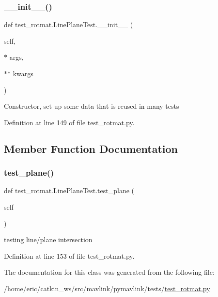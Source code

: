 \subsubsection{\texorpdfstring{\_\_init\_\_()}{\_\_init\_\_()}}
{\footnotesize\ttfamily def test\+\_\+rotmat.\+Line\+Plane\+Test.\+\_\+\+\_\+init\+\_\+\+\_\+ (\begin{DoxyParamCaption}\item[{}]{self,  }\item[{$\ast$}]{args,  }\item[{$\ast$$\ast$}]{kwargs }\end{DoxyParamCaption})}

\begin{DoxyVerb}Constructor, set up some data that is reused in many tests\end{DoxyVerb}
 

Definition at line 149 of file test\+\_\+rotmat.\+py.



\subsection{Member Function Documentation}
\mbox{\label{classtest__rotmat_1_1LinePlaneTest_a0fe03ac8059efebb1df1b6c32e0d18ac}} 
\subsubsection{\texorpdfstring{test\_plane()}{test\_plane()}}
{\footnotesize\ttfamily def test\+\_\+rotmat.\+Line\+Plane\+Test.\+test\+\_\+plane (\begin{DoxyParamCaption}\item[{}]{self }\end{DoxyParamCaption})}

\begin{DoxyVerb}testing line/plane intersection\end{DoxyVerb}
 

Definition at line 153 of file test\+\_\+rotmat.\+py.



The documentation for this class was generated from the following file\+:\begin{DoxyCompactItemize}
\item 
/home/eric/catkin\+\_\+ws/src/mavlink/pymavlink/tests/\mbox{\hyperlink{test__rotmat_8py}{test\+\_\+rotmat.\+py}}\end{DoxyCompactItemize}

